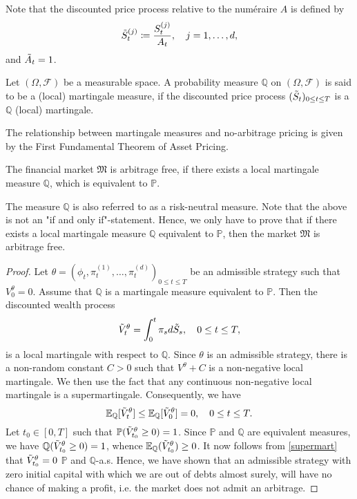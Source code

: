 Note that the discounted price process relative to the numéraire $A$ is defined by
\begin{equation}
    \Tilde{S}_{t}^{(j)}\coloneqq\frac{S_{t}^{(j)}}{A_{t}}, \quad j=1,\dots,d,
\end{equation}
and $\Tilde{A}_{t}=1$.
\begin{defn}
    Let $(\Omega, \mathcal{F})$ be a measurable space. A probability measure $\mathbb{Q}$ on $(\Omega,\mathcal{F})$ is said to be a (local) martingale measure, if the discounted price process $(\Tilde{S}_{t})_{0\leq t\leq T}$ is a $\mathbb{Q}$ (local) martingale.
\end{defn}
The relationship between martingale measures and no-arbitrage pricing is given by the First Fundamental Theorem of Asset Pricing.%
\begin{thm}
The financial market $\mathfrak{M}$ is arbitrage free, if there exists a local martingale measure $\mathbb{Q}$, which is equivalent to $\mathbb{P}$.
\end{thm}
The measure $\mathbb{Q}$ is also referred to as a risk-neutral measure. Note that the above is not an "if and only if"-statement. Hence, we only have to prove that if there exists a local martingale measure $\mathbb{Q}$ equivalent to $\mathbb{P}$, then the market $\mathfrak{M}$ is arbitrage free.
\begin{proof} Let $\theta=(\phi_{t},\pi_{t}^{(1)},\dots,\pi_{t}^{(d)})_{0\leq t\leq T}$ be an admissible strategy such that $V_{0}^{\theta}=0$. Assume that $\mathbb{Q}$ is a martingale measure equivalent to $\mathbb{P}$. Then the discounted wealth process
\begin{equation}
    \Tilde{V}_{t}^{\theta}=\int_{0}^{t}\pi_{s}d\Tilde{S}_{s}, \quad 0\leq t\leq T,
\end{equation}
is a local martingale with respect to $\mathbb{Q}$. Since $\theta$ is an admissible strategy, there is a non-random constant $C>0$ such that $V^{\theta}+C$ is a non-negative local martingale. We then use the fact that any continuous non-negative local martingale is a supermartingale. Consequently, we have
\begin{equation}\label{supermart}
    \mathbb{E}_{\mathbb{Q}}[\Tilde{V}_{t}^{\theta}]\leq \mathbb{E}_{\mathbb{Q}}[\Tilde{V}_{0}^{\theta}]=0, \quad 0\leq t\leq T.
\end{equation}
Let $t_{0}\in [0,T]$ such that $\mathbb{P}(\Tilde{V}_{t_0}^{\theta}\geq 0)=1$. Since $\mathbb{P}$ and $\mathbb{Q}$ are equivalent measures, we have $\mathbb{Q}(\Tilde{V}_{t_0}^{\theta}\geq 0)=1$, whence $\mathbb{E}_{\mathbb{Q}}(\Tilde{V}_{t_{0}}^{\theta})\geq 0$. It now follows from \eqref{supermart} that $\Tilde{V}_{t_{0}}^{\theta}=0$ $\mathbb{P}$ and $\mathbb{Q}$-a.s. Hence, we have shown that an admissible strategy with zero initial capital with which we are out of debts almost surely, will have no chance of making a profit, i.e. the market does not admit an arbitrage.
\end{proof}
